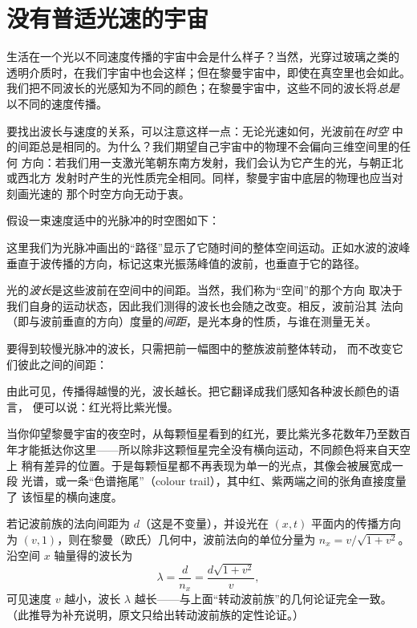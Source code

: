 \section{没有普适光速的宇宙}

生活在一个光以不同速度传播的宇宙中会是什么样子？当然，光穿过玻璃之类的
透明介质时，在我们宇宙中也会这样；但在黎曼宇宙中，即使在真空里也会如此。
我们把不同波长的光感知为不同的颜色；在黎曼宇宙中，这些不同的波长将\emph{总是}
以不同的速度传播。

要找出波长与速度的关系，可以注意这样一点：无论光速如何，光波前在\emph{时空}
中的间距总是相同的。为什么？我们期望自己宇宙中的物理不会偏向三维空间里的任何
方向：若我们用一支激光笔朝东南方发射，我们会认为它产生的光，与朝正北或西北方
发射时产生的光性质完全相同。同样，黎曼宇宙中底层的物理也应当对刻画光速的
那个时空方向无动于衷。

假设一束速度适中的光脉冲的时空图如下：


这里我们为光脉冲画出的“路径”显示了它随时间的整体空间运动。正如水波的波峰
垂直于波传播的方向，标记这束光振荡峰值的波前，也垂直于它的路径。

光的\emph{波长}是这些波前在空间中的间距。当然，我们称为“空间”的那个方向
取决于我们自身的运动状态，因此我们测得的波长也会随之改变。相反，波前沿其
法向（即与波前垂直的方向）度量的\emph{间距}，是光本身的性质，与谁在测量无关。

要得到较慢光脉冲的波长，只需把前一幅图中的整族波前整体转动，
而不改变它们彼此之间的间距：


由此可见，传播得越慢的光，波长越长。把它翻译成我们感知各种波长颜色的语言，
便可以说：红光将比紫光慢。

当你仰望黎曼宇宙的夜空时，从每颗恒星看到的红光，要比紫光多花数年乃至数百
年才能抵达你这里——所以除非这颗恒星完全没有横向运动，不同颜色将来自天空上
稍有差异的位置。于是每颗恒星都不再表现为单一的光点，其像会被展宽成一段
光谱，或一条“色谱拖尾”（colour trail），其中红、紫两端之间的张角直接度量了
该恒星的横向速度。

\begin{notebox}[补充：波长与速度的关系]
若记波前族的法向间距为 $d$（这是不变量），并设光在 $(x,t)$ 平面内的传播方向为
$(v,1)$，则在黎曼（欧氏）几何中，波前法向的单位分量为
$n_x = v/\sqrt{1+v^2}$。沿空间 $x$ 轴量得的波长为
\[
\lambda = \frac{d}{n_x} = \frac{d\sqrt{1+v^2}}{v},
\]
可见速度 $v$ 越小，波长 $\lambda$ 越长——与上面“转动波前族”的几何论证完全一致。
（此推导为补充说明，原文只给出转动波前族的定性论证。）
\end{notebox}

